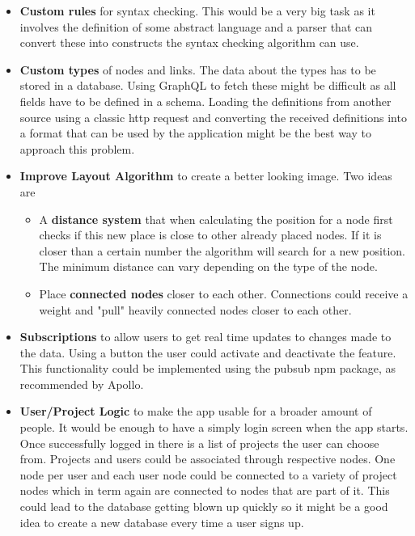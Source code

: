 \begin{itemize}
\item \textbf{Custom rules} for syntax checking. This would be a very big task as it involves the definition of some abstract language and a parser that can convert these into constructs the syntax checking algorithm can use.

\item \textbf{Custom types} of nodes and links. The data about the types has to be stored in a database. Using GraphQL to fetch these might be difficult as all fields have to be defined in a schema. Loading the definitions from another source using a classic http request and converting the received definitions into a format that can be used by the application might be the best way to approach this problem.

\item \textbf{Improve Layout Algorithm} to create a better looking image. Two ideas are
\begin{itemize}
\item A \textbf{distance system} that when calculating the position for a node first checks if this new place is close to other already placed nodes. If it is closer than a certain number the algorithm will search for a new position. The minimum distance can vary depending on the type of the node.
\item Place \textbf{connected nodes} closer to each other. Connections could receive a weight and "pull" heavily connected nodes closer to each other.
\end{itemize}

\item \textbf{Subscriptions} to allow users to get real time updates to changes made to the data. Using a button the user could activate and deactivate the feature. This functionality could be implemented using the pubsub npm package, as recommended by Apollo.

\item \textbf{User/Project Logic} to make the app usable for a broader amount of people. It would be enough to have a simply login screen when the app starts. Once successfully logged in there is a list of projects the user can choose from. Projects and users could be associated through respective nodes. One node per user and each user node could be connected to a variety of project nodes which in term again are connected to nodes that are part of it. This could lead to the database getting blown up quickly so it might be a good idea to create a new database every time a user signs up.


\end{itemize}
